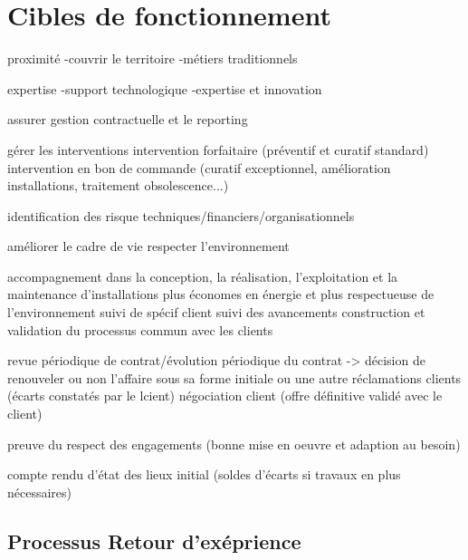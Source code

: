 \chapter{Cibles de fonctionnement}

proximité
-couvrir le territoire
-métiers traditionnels

expertise
-support technologique
-expertise et innovation

assurer gestion contractuelle et le reporting

gérer les interventions
intervention forfaitaire (préventif et curatif standard)
intervention en bon de commande (curatif exceptionnel, amélioration installations, traitement obsolescence...)

identification des risque techniques/financiers/organisationnels

améliorer le cadre de vie
respecter l'environnement

accompagnement dans la conception, la réalisation, l'exploitation et la maintenance d'installations plus économes en énergie et plus respectueuse de l'environnement
suivi de spécif client
suivi des avancements
construction et validation du processus commun avec les clients

revue périodique de contrat/évolution périodique du contrat -> décision de renouveler ou non l'affaire sous sa forme initiale ou une autre
réclamations clients (écarts constatés par le lcient)
négociation client (offre définitive validé avec le client)

preuve du respect des engagements (bonne mise en oeuvre et adaption au besoin)

compte rendu d'état des lieux initial (soldes d'écarts si travaux en plus nécessaires)




\section{Processus Retour d'exéprience}

